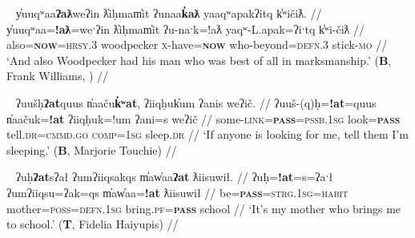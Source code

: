 \begin{comment}
\ex \label{ex:doubleatl2}
\begingl
\glpreamble ʔuḥʔaƛ tiic̓̌ap̓aƛ hałmiiḥa. //
\gla ʔuḥ=!aƛ tiic=!ap=!aƛ hałmiiḥa  //
\glb be=\textsc{now} alive.\textsc{dr}=\textsc{caus}=\textsc{now} drown.\textsc{cv} //
\glft `He made him alive from drowning.' (\textbf{C}, \textit{tupaat} Julia Lucas) //
\endgl
\xe
\end{comment}

\ex~ \label{ex:doubleatlyuuqwaa}
\begingl
\glpreamble y̓uuqʷaa\textbf{ʔaƛ}weʔin ƛ̓iḥmam̓it ʔunaa\textbf{k̓aƛ} yaaqʷapakʔitq k̓ʷičiƛ. //
\gla y̓uuqʷaa=\textbf{!aƛ}=weˑʔin ƛ̓iḥmam̓it ʔu-naˑk=!aƛ yaqʷ-L.apak=ʔiˑtq k̓ʷi-čiƛ  //
\glb also=\textbf{\textsc{now}}=\textsc{hrsy.3} woodpecker \textsc{x}-have=\textbf{\textsc{now}} who-beyond=\textsc{defn.3} stick-\textsc{mo} //
\glft `And also Woodpecker had his man who was best of all in marksmanship.' (\textbf{B}, Frank Williams, \citealt[p.~50]{sapir1939}) //
\endgl
\xe


\begin{comment}
\ex~ \label{ex:doubleap}
\begingl
\glpreamble hišuk̓ap̓aƛ witkʷaaʔap ʔin wikmaḥsap̓aƛ, ḥaakʷaaƛsma. //
\gla hišuk=!ap=!aƛ witkʷaa=!ap ʔin wik-maḥsa=!ap=!aƛ, ḥaakʷaaƛ-sma  //
\glb all=\textsc{caus}=\textsc{now} destroy=\textsc{caus} \textsc{comp} \textsc{neg}-want.to=\textsc{caus}=\textsc{caus} young.woman-protective.of //
\glft `Everyone destroyed the wharf because they wanted her to marry, they were stingy of the girl.' (\textbf{C}, \textit{tupaat} Julia Lucas) //
\endgl
\xe
\end{comment}


\ex~ \label{ex:doubleatuush}
\begingl
\glpreamble ʔuušḥ\textbf{ʔat}quus n̓aaču\textbf{k̓ʷat}, ʔiiqḥuk̓um ʔanis weʔič. //
\gla ʔuuš-(q)ḥ=\textbf{!at}=quus n̓aačuk=\textbf{!at} ʔiiqḥuk=!um ʔani=s weʔič  //
\glb some-\textsc{link}=\textbf{\textsc{pass}}=\textsc{pssb.1sg} look=\textbf{\textsc{pass}} tell.\textsc{dr}=\textsc{cmmd.go} \textsc{comp}=\textsc{1sg} sleep.\textsc{dr} //
\glft `If anyone is looking for me, tell them I'm sleeping.' (\textbf{B}, Marjorie Touchie) //
\endgl
\xe

\ex~ \label{ex:doubleatuh}
\begingl
\glpreamble ʔuḥ\textbf{ʔat}sʔał ʔumʔiiqsakqs m̓aw̓aa\textbf{ʔat} ƛiisuwił. //
\gla ʔuḥ=\textbf{!at}=s=ʔaˑł ʔumʔiiqsu=ʔak=qs m̓aw̓aa=\textbf{!at} ƛiisuwił  //
\glb be=\textbf{\textsc{pass}}=\textsc{strg.1sg}=\textsc{habit} mother=\textsc{poss}=\textsc{defn.1sg} bring.\textsc{pf}=\textbf{\textsc{pass}} school //
\glft `It's my mother who brings me to school.' (\textbf{T}, Fidelia Haiyupis) //
\endgl
\xe

